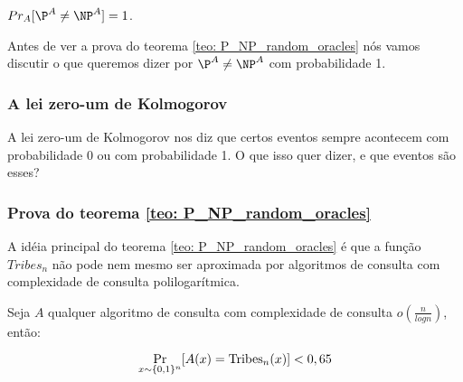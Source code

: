 \begin{teo} \label{teo: P_NP_random_oracles}

$Pr_{A}[\P^{A} \neq \NP^{A}] = 1$.

\end{teo}

Antes de ver a prova do teorema \ref{teo: P_NP_random_oracles} nós vamos discutir o que queremos dizer por $\P^{A} \neq \NP^{A}$ com probabilidade 1.

\subsubsection{A lei zero-um de Kolmogorov}

A lei zero-um de Kolmogorov nos diz que certos eventos sempre acontecem com probabilidade 0 ou com probabilidade 1. O que isso quer dizer, e que eventos são esses? 


\subsubsection{Prova do teorema \ref{teo: P_NP_random_oracles}}

A idéia principal do teorema \ref{teo: P_NP_random_oracles} é que a função $Tribes_{n}$ não pode nem mesmo ser aproximada por algoritmos de consulta com complexidade de consulta polilogarítmica.

\begin{prop} \label{prop: tribes_inaproximability}

Seja $A$ qualquer algoritmo de consulta com complexidade de consulta $o(\frac{n}{logn})$, então:

\begin{equation*}
    \Pr_{x \sim \{0, 1\}^{n}}[A(x) = \text{Tribes}_{n}(x)] < 0,65 
\end{equation*}

\end{prop}

